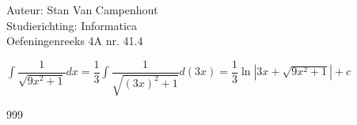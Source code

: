 \documentclass[a4paper]{article}
\begin{document}
  
\noindent \large Auteur: Stan Van Campenhout \\
\noindent \large Studierichting:  Informatica\\
\noindent \large Oefeningenreeks 4A nr. 41.4\\

\medskip

\normalsize

$ \displaystyle\int\dfrac{1}{\sqrt{9x^2 + 1}}dx = \dfrac{1}{3}\displaystyle\int\dfrac{1}{\sqrt{\left(3x\right)^2 + 1}}d\left(3x\right) 
= \dfrac{1}{3}\ln|3x + \sqrt{9x^2 + 1}| + c $\\

\begin{thebibliography}{999}
\end{thebibliography}
\end{document}
